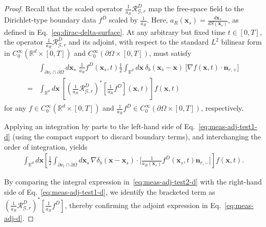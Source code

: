\documentclass[11pt,reqno]{amsart}
\theoremstyle{remark}
\theoremstyle{italic_lemma}
\newcommand{\bx}{\boldsymbol{x}}
\newcommand{\bn}{\boldsymbol{n}}
\begin{document}
\begin{proof}
Recall that the scaled operator \(   \frac{1}{a_R}\mathcal{R}_{\mathcal{G},r}^D  \) map the free-space field to the Dirichlet-type boundary data
\(   f^D \) scaled by \( \frac{1}{a_R} \). Here, \(a_R(\bx_s) = \frac{d\bx_s}{dS(\bx_s) } \), as defined in Eq.~\eqref{eq:dirac-delta-surface}. At any arbitrary but fixed time \( t \in [0, T] \), the operator \( \frac{1}{a_R}\mathcal{R}_{\mathcal{G},r}^D  \) and its adjoint, with respect to the standard \( L^2 \) bilinear form in \( C_0^{\infty}(\mathbb{R}^d \times [0,T]) \) and \( C_0^{\infty}(\partial \Omega \times [0,T]) \), must satisfy
\begin{align}\label{eq:meas-adj-test1-d}
\begin{split}
 & \int_{\partial \nu_r \cap \partial \Omega} d \bx_s \, \, \frac{1}{a_R} f^D(\bx_s,t)  \frac{1}{2}   \int_{\mathbb{R}^d} d\bx \  \delta_b(\bx_s - \bx)\  \big[ \nabla  f(\bx, t) \cdot \bn_{r,+}\big]   \\
= &\int_{\mathbb{R}^d} d\bx \ \left[ \left(\frac{1}{a_R} \mathcal{R}_{\mathcal{G},r}^D \right)^* [\frac{1}{a_R} f^D](\bx, t) \right] f(\bx, t)
\end{split}
\end{align}
for any  \( f \in C_0^{\infty}(\mathbb{R}^d \times [0,T]) \) and \( \frac{1}{a_R} f^D \in C_0^{\infty}(\partial \Omega \times [0, T]) \), respectively. 


Applying an integration by parts to the left-hand side of Eq.~\eqref{eq:meas-adj-test1-d} (using the compact support to discard boundary terms), and interchanging the order of integration, yields
\begin{align}  \label{eq:meas-adj-test2-d} 
   \int_{\mathbb{R}^d} d\bx \left[   \frac{1}{2} \displaystyle\int_{\partial \nu_r \cap \partial \Omega} d \bx_s\,  \nabla \delta_b(\bx - \bx_s) \cdot \big[\frac{1}{a_R(\bx_s)}f^D(\bx_s, t) \bn_{r,-} \big] \right] f(\bx, t).
\end{align}

By comparing the integral expression in~\eqref{eq:meas-adj-test2-d} with the right-hand side of Eq.~\eqref{eq:meas-adj-test1-d}, we identify the bracketed term as \( \left( \frac{1}{a_R} \mathcal{R}_{\mathcal{G},r}^D \right)^* [\frac{1}{a_R} f^D] \), thereby confirming the adjoint expression in Eq.~\eqref{eq:meas-adj-d}.
\end{proof}
\end{document}
